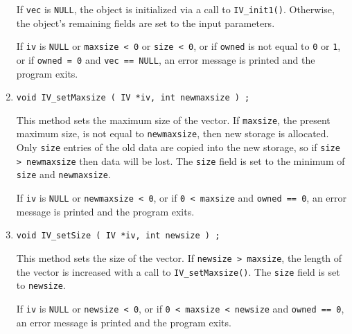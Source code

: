 \begin{enumerate}
If {\tt vec} is {\tt NULL}, the object is initialized via a call
to {\tt IV\_init1()}.
Otherwise, the object's remaining fields 
are set to the input parameters.
\par {}
If {\tt iv} is {\tt NULL} or {\tt maxsize < 0} or {\tt size < 0},
or if {\tt owned} is not equal to {\tt 0} or {\tt 1},
or if {\tt owned = 0} and {\tt vec == NULL},
an error message is printed and the program exits.
\item
\begin{verbatim}
void IV_setMaxsize ( IV *iv, int newmaxsize ) ;
\end{verbatim}
This method sets the maximum size of the vector.
If {\tt maxsize}, the present maximum size, 
is not equal to {\tt newmaxsize}, then new storage is allocated.
Only {\tt size} entries of the old data are copied into the new
storage, so if {\tt size > newmaxsize} then data will be lost.
The {\tt size} field is set to the minimum of {\tt size} 
and {\tt newmaxsize}.
\par {}
If {\tt iv} is {\tt NULL} or {\tt newmaxsize < 0},
or if {\tt 0 < maxsize} and {\tt owned == 0},
an error message is printed and the program exits.
\item
\begin{verbatim}
void IV_setSize ( IV *iv, int newsize ) ;
\end{verbatim}
This method sets the size of the vector.
If {\tt newsize > maxsize}, the length of the vector is increased
with a call to {\tt IV\_setMaxsize()}.
The {\tt size} field is set to {\tt newsize}.
\par {}
If {\tt iv} is {\tt NULL} or {\tt newsize < 0},
or if {\tt 0 < maxsize < newsize} and {\tt owned == 0},
an error message is printed and the program exits.
\end{enumerate}
\par
